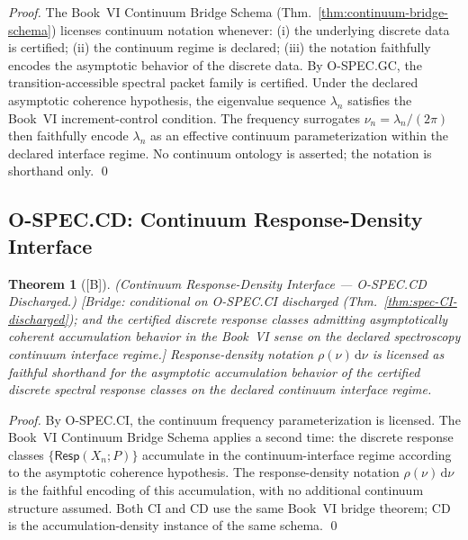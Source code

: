 \documentclass[12pt,oneside]{amsbook}
\theoremstyle{plain}
\newtheorem{theorem}{Theorem}[section]
\theoremstyle{definition}
\theoremstyle{remark}
\newcommand{\status}[1]{\textup{[#1]}}
\begin{document}
\begin{proof}
The Book~VI Continuum Bridge Schema (Thm.~\ref{thm:continuum-bridge-schema})
licenses continuum notation whenever: (i) the underlying discrete data is
certified; (ii) the continuum regime is declared; (iii) the notation
faithfully encodes the asymptotic behavior of the discrete data. By
O-SPEC.GC, the transition-accessible spectral packet family is certified.
Under the declared asymptotic coherence hypothesis, the eigenvalue sequence
$\lambda_n$ satisfies the Book~VI increment-control condition. The frequency
surrogates $\nu_n = \lambda_n / (2\pi)$ then faithfully encode $\lambda_n$
as an effective continuum parameterization within the declared interface
regime. No continuum ontology is asserted; the notation is shorthand only.
\qed
\end{proof}

\subsection{O-SPEC.CD: Continuum Response-Density Interface}\label{sec:spec-CD}

\begin{theorem}[\status{B}]\label{thm:spec-CD-discharged}
\textup{(Continuum Response-Density Interface --- O-SPEC.CD Discharged.)}
\textup{[Bridge: conditional on O-SPEC.CI discharged
(Thm.~\ref{thm:spec-CI-discharged}); and the certified discrete response
classes admitting asymptotically coherent accumulation behavior in the
Book~VI sense on the declared spectroscopy continuum interface regime.]}
Response-density notation $\rho(\nu)\,\mathrm{d}\nu$ is licensed as
faithful shorthand for the asymptotic accumulation behavior of the certified
discrete spectral response classes on the declared continuum interface
regime.
\end{theorem}

\begin{proof}
By O-SPEC.CI, the continuum frequency parameterization is licensed.
The Book~VI Continuum Bridge Schema applies a second time: the discrete
response classes $\{\mathsf{Resp}(X_n; P)\}$ accumulate in the
continuum-interface regime according to the asymptotic coherence
hypothesis. The response-density notation $\rho(\nu)\,\mathrm{d}\nu$
is the faithful encoding of this accumulation, with no additional continuum
structure assumed. Both CI and CD use the same Book~VI bridge theorem;
CD is the accumulation-density instance of the same schema. \qed
\end{proof}
\end{document}
